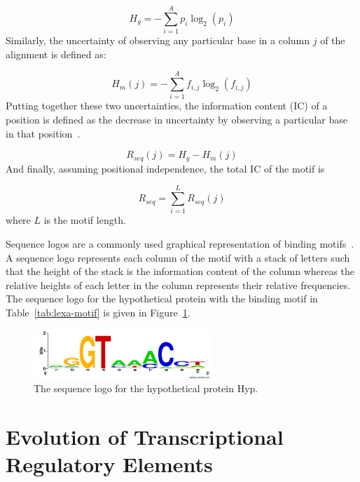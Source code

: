 \begin{equation}
  \label{eq:hg}
  H_g = -\displaystyle\sum_{i=1}^A p_i \log_2(p_i)
\end{equation}
Similarly, the uncertainty of observing any particular base in a column $j$ of
the alignment is defined as:

\begin{equation}
  \label{eq:hm}
  H_m(j) = -\displaystyle\sum_{i=1}^A f_{i, j} \log_2(f_{i, j})
\end{equation}
Putting together these two uncertainties, the information content (IC) of a
position is defined as the decrease in uncertainty by observing a particular
base in that position~\citep{schneider1986information}.

\begin{equation}
  \label{eq:rseq}
  R_{seq}(j) = H_g - H_m(j)
\end{equation}
And finally, assuming positional independence, the total IC of the motif is

\begin{equation}
  \label{eq:1}
  R_{seq} = \displaystyle\sum_{i=1}^L R_{seq}(j)
\end{equation}
where $L$ is the motif length.

Sequence logos are a commonly used graphical representation of binding
motifs~\citep{schneider1990sequence, crooks2004weblogo}. A sequence logo
represents each column of the motif with a stack of letters such that the
height of the stack is the information content of the column whereas the
relative heights of each letter in the column represents their relative
frequencies. The sequence logo for the hypothetical protein with the binding
motif in Table~\ref{tab:lexa-motif} is given in Figure~\ref{fig:lexa}.

\begin{figure}
  \centering
  \includegraphics[width=0.6\textwidth]{figures/chapter1/hyp.png}
  \caption{The sequence logo for the hypothetical protein Hyp.}
  \label{fig:lexa}
\end{figure}

\section{Evolution of Transcriptional Regulatory Elements}

